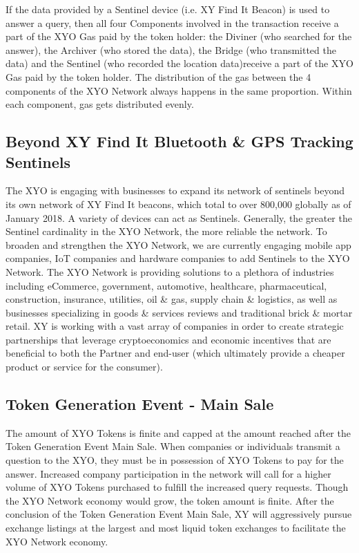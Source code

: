 \documentclass{article}
\begin{document}
If the data provided by a Sentinel device (i.e. XY Find It Beacon) is used to answer a query, then all four Components involved in the transaction receive a part of the XYO Gas paid by the token holder: the Diviner (who searched for the answer), the Archiver (who stored the data), the Bridge (who transmitted the data) and the Sentinel (who recorded the location data)receive a part of the XYO Gas paid by the token holder. The distribution of the gas between the 4 components of the XYO Network always happens in the same proportion.  Within each component, gas gets distributed evenly.

\subsection {Beyond XY Find It Bluetooth \& GPS Tracking Sentinels}
The \Gls{XYO} is engaging with businesses to expand its network of \Glspl{sentinel} beyond its own network of XY Find It beacons, which total to over 800,000 globally as of January 2018. A variety of devices can act as Sentinels. Generally, the greater the Sentinel cardinality in the XYO Network, the more reliable the network. To broaden and strengthen the XYO Network, we are currently engaging mobile app companies, IoT companies and hardware companies to add Sentinels to the XYO Network. The XYO Network is providing solutions to a plethora of industries including eCommerce, government, automotive, healthcare, pharmaceutical, construction, insurance, utilities, oil \& gas, supply chain \& logistics, as well as businesses specializing in goods \& services reviews and traditional brick \& mortar retail. XY is working with a vast array of companies in order to create strategic partnerships that leverage \gls{cryptoeconomics} and economic incentives that are beneficial to both the Partner and end-user (which ultimately provide a cheaper product or service for the consumer).

\subsection {Token Generation Event - Main Sale}
The amount of XYO Tokens is finite and capped at the amount reached after the Token Generation Event Main Sale. When companies or individuals transmit a question to the \Gls{XYO}, they must be in possession of XYO Tokens to pay for the answer. Increased company participation in the network will call for a higher volume of XYO Tokens purchased to fulfill the increased query requests. Though the XYO Network economy would grow, the token amount is finite. After the conclusion of the Token Generation Event Main Sale, XY will aggressively pursue exchange listings at the largest and most liquid token exchanges to facilitate the XYO Network economy.
\end{document}
